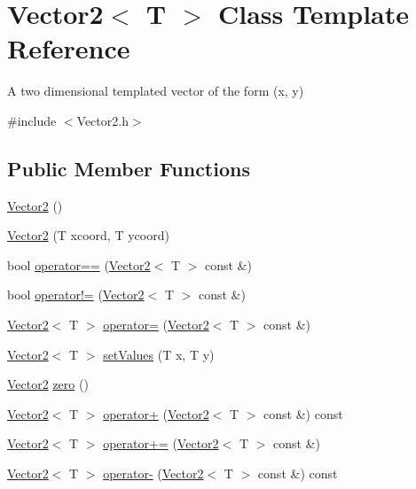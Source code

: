 \hypertarget{classVector2}{\section{Vector2$<$ T $>$ Class Template Reference}
\label{classVector2}
}


A two dimensional templated vector of the form (x, y)  




{\ttfamily \#include $<$Vector2.\-h$>$}

\subsection*{Public Member Functions}
\begin{DoxyCompactItemize}
\item 
\hyperlink{classVector2_ae2f1223cb0d664aa73afb789086a4174}{Vector2} ()
\item 
\hyperlink{classVector2_ad79ae2f328cd2b8d895566305acdf04d}{Vector2} (T xcoord, T ycoord)
\item 
bool \hyperlink{classVector2_a84cd3fd4795023c476c544c4d889faf1}{operator==} (\hyperlink{classVector2}{Vector2}$<$ T $>$ const \&)
\item 
bool \hyperlink{classVector2_a665455a989653e79f21b03302619d6bd}{operator!=} (\hyperlink{classVector2}{Vector2}$<$ T $>$ const \&)
\item 
\hyperlink{classVector2}{Vector2}$<$ T $>$ \hyperlink{classVector2_a6434426c127577c1f66525bb903aec52}{operator=} (\hyperlink{classVector2}{Vector2}$<$ T $>$ const \&)
\item 
\hyperlink{classVector2}{Vector2}$<$ T $>$ \hyperlink{classVector2_aa581ba273bb347e93058a2e2b696a329}{set\-Values} (T x, T y)
\item 
\hyperlink{classVector2}{Vector2} \hyperlink{classVector2_af2b0a7852790bdf522f74db750b6d143}{zero} ()
\item 
\hyperlink{classVector2}{Vector2}$<$ T $>$ \hyperlink{classVector2_a98ffd6c779d7a4011f6a8f1a05ee6f9a}{operator+} (\hyperlink{classVector2}{Vector2}$<$ T $>$ const \&) const 
\item 
\hyperlink{classVector2}{Vector2}$<$ T $>$ \hyperlink{classVector2_ada9ee9f6d6c88e6e8c7a9c84da177b49}{operator+=} (\hyperlink{classVector2}{Vector2}$<$ T $>$ const \&)
\item 
\hyperlink{classVector2}{Vector2}$<$ T $>$ \hyperlink{classVector2_a43088957bb9fba96a73d564ca7c68fb6}{operator-\/} (\hyperlink{classVector2}{Vector2}$<$ T $>$ const \&) const 

\end{DoxyCompactItemize}
